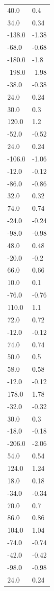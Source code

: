 \begin{longtable}{ll}
40.0 & 0.4 \\
34.0 & 0.34 \\
-138.0 & -1.38 \\
-68.0 & -0.68 \\
-180.0 & -1.8 \\
-198.0 & -1.98 \\
-38.0 & -0.38 \\
24.0 & 0.24 \\
30.0 & 0.3 \\
120.0 & 1.2 \\
-52.0 & -0.52 \\
24.0 & 0.24 \\
-106.0 & -1.06 \\
-12.0 & -0.12 \\
-86.0 & -0.86 \\
32.0 & 0.32 \\
74.0 & 0.74 \\
-24.0 & -0.24 \\
-98.0 & -0.98 \\
48.0 & 0.48 \\
-20.0 & -0.2 \\
66.0 & 0.66 \\
10.0 & 0.1 \\
-76.0 & -0.76 \\
110.0 & 1.1 \\
72.0 & 0.72 \\
-12.0 & -0.12 \\
74.0 & 0.74 \\
50.0 & 0.5 \\
58.0 & 0.58 \\
-12.0 & -0.12 \\
178.0 & 1.78 \\
-32.0 & -0.32 \\
30.0 & 0.3 \\
-18.0 & -0.18 \\
-206.0 & -2.06 \\
54.0 & 0.54 \\
124.0 & 1.24 \\
18.0 & 0.18 \\
-34.0 & -0.34 \\
70.0 & 0.7 \\
86.0 & 0.86 \\
104.0 & 1.04 \\
-74.0 & -0.74 \\
-42.0 & -0.42 \\
-98.0 & -0.98 \\
24.0 & 0.24 \\

\end{longtable}

